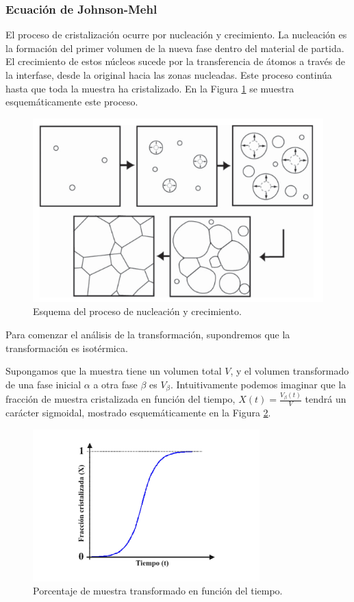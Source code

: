 \documentclass[12pt]{article}
\theoremstyle{definition}
\theoremstyle{remark}
\begin{document}
\subsubsection{Ecuación de Johnson-Mehl}

 El proceso de cristalización ocurre por nucleación y crecimiento. La nucleación es la formación del primer volumen de la nueva fase dentro del material de partida. El crecimiento de estos núcleos sucede por la transferencia de átomos a través de la interfase, desde la original hacia las zonas nucleadas. Este proceso continúa hasta que toda la muestra ha cristalizado. En la Figura \ref{cristalization} se muestra esquemáticamente este proceso.
 \begin{figure}[H]
 	\centering
	\includegraphics[scale=0.5]{img/cristalization.png}
 	\caption{Esquema del proceso de nucleación y crecimiento.}
	\label{cristalization}
\end{figure} 

Para comenzar el análisis de la transformación, supondremos que la transformación es isotérmica.

Supongamos que la muestra tiene un volumen total $V$, y el volumen transformado de una fase inicial $\alpha$ a otra fase $\beta$ es $V_\beta$. Intuitivamente podemos imaginar que la fracción de muestra cristalizada en función del tiempo, $X(t) = \frac{V_\beta (t)}{V}$ tendrá un carácter sigmoidal, mostrado esquemáticamente en la Figura \ref{cvst}.

 \begin{figure}[H]
 	\centering
	\includegraphics[scale=1]{img/cristalization_vs_tiempo.png}
 	\caption{Porcentaje de muestra transformado en función del tiempo.}
	\label{cvst}
\end{figure} 
\end{document}
